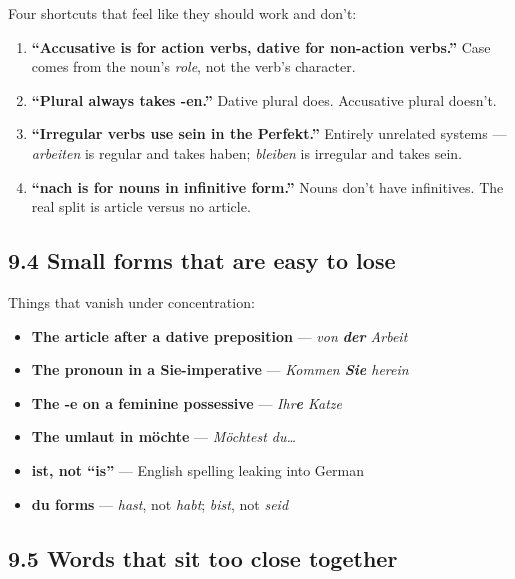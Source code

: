 \documentclass[
  11pt,
]{article}
\providecommand{\tightlist}{%
  \setlength{\itemsep}{0pt}\setlength{\parskip}{0pt}}
\begin{document}
Four shortcuts that feel like they should work and don't:

\begin{enumerate}
\def\labelenumi{\arabic{enumi}.}
\tightlist
\item
  \textbf{``Accusative is for action verbs, dative for non-action
  verbs.''} Case comes from the noun's \emph{role}, not the verb's
  character.
\item
  \textbf{``Plural always takes -en.''} Dative plural does. Accusative
  plural doesn't.
\item
  \textbf{``Irregular verbs use sein in the Perfekt.''} Entirely
  unrelated systems --- \emph{arbeiten} is regular and takes haben;
  \emph{bleiben} is irregular and takes sein.
\item
  \textbf{``nach is for nouns in infinitive form.''} Nouns don't have
  infinitives. The real split is article versus no article.
\end{enumerate}

\subsection{9.4 Small forms that are easy to
lose}\label{small-forms-that-are-easy-to-lose}

Things that vanish under concentration:

\begin{itemize}
\tightlist
\item
  \textbf{The article after a dative preposition} --- \emph{von
  \textbf{der} Arbeit}
\item
  \textbf{The pronoun in a Sie-imperative} --- \emph{Kommen \textbf{Sie}
  herein}
\item
  \textbf{The -e on a feminine possessive} --- \emph{Ihr\textbf{e}
  Katze}
\item
  \textbf{The umlaut in möchte} --- \emph{Möchtest du\ldots{}}
\item
  \textbf{ist, not ``is''} --- English spelling leaking into German
\item
  \textbf{du forms} --- \emph{hast}, not \emph{habt}; \emph{bist}, not
  \emph{seid}
\end{itemize}

\subsection{9.5 Words that sit too close
together}\label{words-that-sit-too-close-together}
\end{document}
